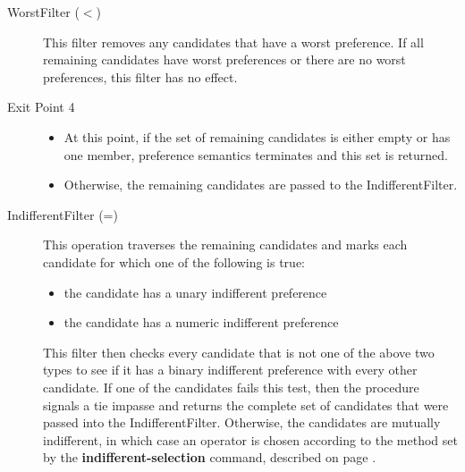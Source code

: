 \begin{description}
\item[WorstFilter ($<$) ] This filter removes any candidates that have
	a worst preference. If all remaining candidates have worst preferences or there
	are no worst preferences, this filter has no effect.

\item[Exit Point 4]
	\begin{itemize}
	\item At this point, if the set of remaining candidates is either empty or has one
	member, preference semantics terminates and this set is returned.
	\item Otherwise, the remaining candidates are passed to the
	IndifferentFilter.
	\end{itemize}
\index{-}

\index{=}
\item[IndifferentFilter (=) ] This operation traverses the remaining candidates and marks 
	each candidate for which one of the following is true:
	\begin{itemize}
	\item the candidate has a unary indifferent preference
	\item the candidate has a numeric indifferent preference
	\end{itemize}
	This filter then checks every candidate that is not one of the above two types
	to see if it has a binary indifferent preference with every other candidate.
	If one of the candidates fails this test, then the procedure signals a tie impasse
	and returns the complete set of candidates that were passed into the 
	IndifferentFilter. Otherwise, the candidates are mutually indifferent, in which case 
	an operator is chosen according to the method set by the 
	\textbf{indifferent-selection} command, described on 
	page \pageref{decide-indifferent-selection}.
\end{description}

